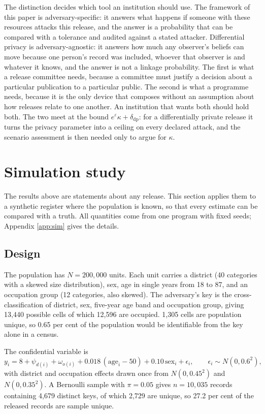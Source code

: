 \documentclass[11pt,a4paper]{article}
\theoremstyle{plain}
\theoremstyle{definition}
\theoremstyle{definition}
\theoremstyle{plain}
\begin{document}
The distinction decides which tool an institution should use. The framework of this paper is
adversary-specific: it answers what happens if someone with these resources
attacks this release, and the answer is a probability that can be compared with a
tolerance and audited against a stated attacker. Differential privacy is
adversary-agnostic: it answers how much any observer's beliefs can move because
one person's record was included, whoever that observer is and whatever it knows,
and the answer is not a linkage probability. The first is what a release committee
needs, because a committee must justify a decision about a particular publication
to a particular public. The second is what a programme needs, because it is the
only device that composes without an assumption about how releases relate to one
another. An institution that wants both should hold both. The two meet at the
bound $e^{\varepsilon}\kappa + \delta_{\mathrm{dp}}$: for a differentially private
release it turns the privacy parameter into a ceiling on every declared attack,
and the scenario assessment is then needed only to argue for $\kappa$.

\section{Simulation study}\label{sec:sim}

The results above are statements about any release. This section applies them
to a synthetic register where the population is known, so that every estimate
can be compared with a truth. All quantities come from one program with
fixed seeds; Appendix \ref{app:sim} gives the details.

\subsection{Design}

The population has $N = 200{,}000$ units. Each unit carries a district (40
categories with a skewed size distribution), sex, age in single years from 18
to 87, and an occupation group (12 categories, also skewed). The adversary's
key is the cross-classification of district, sex, five-year age band and
occupation group, giving 13,440 possible cells of which 12,596 are occupied.
1,305 cells are population unique, so 0.65 per cent of the population would be
identifiable from the key alone in a census.

The confidential variable is
\begin{equation}
y_i = 8 + \psi_{d(i)} + \omega_{o(i)} + 0.018\,(\mathrm{age}_i - 50)
+ 0.10\,\mathrm{sex}_i + \epsilon_i , \qquad
\epsilon_i \sim N(0, 0.6^2) ,
\end{equation}
with district and occupation effects drawn once from $N(0, 0.45^2)$ and
$N(0, 0.35^2)$. A Bernoulli sample with $\pi = 0.05$ gives $n = 10{,}035$
records containing 4,679 distinct keys, of which 2,729 are unique, so 27.2 per
cent of the released records are sample unique.
\end{document}
